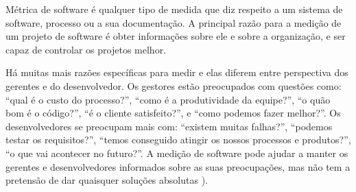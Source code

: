 Métrica de software é qualquer tipo de medida que diz respeito a um sistema de software, processo ou a sua documentação. A principal razão para a medição de um projeto de software é obter informações sobre ele e sobre a organização, e ser capaz de controlar os projetos melhor.

Há muitas mais razões específicas para medir e elas diferem entre perspectiva dos gerentes e do desenvolvedor. Os gestores estão preocupados com questões como: ``qual é o custo do processo?'', ``como é a produtividade da equipe?'', ``o quão bom é o código?'', ``é o cliente satisfeito?'', e ``como podemos fazer melhor?''. Os desenvolvedores se preocupam mais com: ``existem muitas falhas?'', ``podemos testar os requisitos?'', ``temos conseguido atingir os nossos processos e produtos?'', ``o que vai acontecer no futuro?''. A medição de software pode ajudar a manter os gerentes e desenvolvedores informados sobre as suas preocupações, mas não tem a pretensão de dar quaisquer soluções absolutas \cite{lindstrom2004software}).
